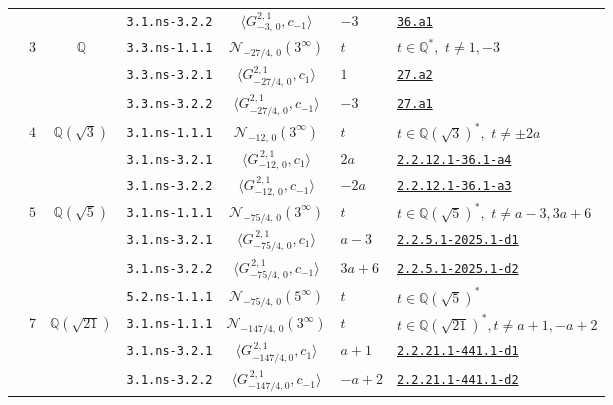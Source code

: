 \documentclass[11pt]{amsart}
\newcommand{\eclabel}[1]{\href{https://www.lmfdb.org/EllipticCurve/Q/#1}{\texttt{#1}}}
\newcommand{\ecnflabel}[2]{\href{https://www.lmfdb.org/EllipticCurve/#1-#2}{\texttt{#1-#2}}}
\theoremstyle{definition}
\newcommand{\Q}{\mathbb Q}
\newcommand{\QQ}{\mathbb Q}
\begin{document}
{\begin{longtable}{|c|c|c|c|c|l|l|}
 & &  & \texttt{3.1.ns-3.2.2} & $\langle G^{2,1}_{-3,\,0},c_{-1}\rangle$ &   $-3$ & \eclabel{36.a1} \\ \cline{2-7}
& {$3$} & {$\QQ$}  
& \texttt{3.3.ns-1.1.1} & $\mathcal{N}_{-27/4,\,0}(3^{\infty})$  &   $t$ &  $t\in \Q^*,\,\,t\ne 1,-3 $ \\ \cline{4-7} 
& &  & \texttt{3.3.ns-3.2.1} & $\langle G^{2,1}_{-27/4,\,0},c_{1}\rangle$ &   $1$ &  \eclabel{27.a2} \\ \cline{4-7} 
& &  & \texttt{3.3.ns-3.2.2} &  $\langle G^{2,1}_{-27/4,\,0},c_{-1}\rangle$ &   $-3$ & \eclabel{27.a1} \\ \cline{2-7}
 & {$4$} &  {$\Q(\sqrt{3})$} 
 & \texttt{3.1.ns-1.1.1} & $\mathcal{N}_{-12,\,0}(3^{\infty})$ &   $t$ &  $t\in \Q(\sqrt{3})^*,\,\,t\ne \pm 2a $ \\ \cline{4-7} 
& &  & \texttt{3.1.ns-3.2.1} & $\langle G^{\,2,1}_{-12,\,0},c_{1}\rangle$ &   $2a$ &  \ecnflabel{2.2.12.1}{36.1-a4} \\ \cline{4-7} 
& &  & \texttt{3.1.ns-3.2.2} & $\langle G^{\,2,1}_{-12,\,0},c_{-1}\rangle$ &   $-2a$ &  \ecnflabel{2.2.12.1}{36.1-a3} \\ 
\cline{2-7}
 &  {$5$} &  {$\Q(\sqrt{5})$} 
& \texttt{3.1.ns-1.1.1} & $\mathcal{N}_{-75/4,\,0}(3^{\infty})$ &   $t$ &  $t\in \Q(\sqrt{5})^*,\,\,t\ne a - 3, 3a + 6  $ \\ \cline{4-7} 
&& &   \texttt{3.1.ns-3.2.1} & $\langle G^{\,2,1}_{-75/4,\,0},c_{1}\rangle$ &   $a - 3$ &  \ecnflabel{2.2.5.1}{2025.1-d1} \\ 
\cline{4-7} 
&&   & \texttt{3.1.ns-3.2.2} & $\langle G^{\, 2,1}_{-75/4,\,0},c_{-1}\rangle$ &   $3a + 6$ & \ecnflabel{2.2.5.1}{2025.1-d2} \\ \cline{4-7} 
& &  & \texttt{5.2.ns-1.1.1} & $\mathcal{N}_{-75/4,\,0}(5^{\infty})$ &   $t$ &  $t\in \Q(\sqrt{5})^*$ \\ \cline{2-7}
 & {$7$} &  {$\Q(\sqrt{21})$} 
 & \texttt{3.1.ns-1.1.1} & $\mathcal{N}_{-147/4,\,0}(3^{\infty})$ &   $t$ &  $t\in \Q(\sqrt{21})^*, t \ne a + 1, -a + 2$ \\ \cline{4-7} 
& &  & \texttt{3.1.ns-3.2.1} & $\langle G^{\, 2, 1}_{-147/4, 0}, c_1 \rangle$ &   $a + 1$ &  \ecnflabel{2.2.21.1}{441.1-d1} \\ \cline{4-7} 
& &  & \texttt{3.1.ns-3.2.2} & $\langle G^{\, 2, 1}_{-147/4, 0}, c_{-1} \rangle$ &   $-a + 2$ &  \ecnflabel{2.2.21.1}{441.1-d2}  \\ \cline{4-7} 

\end{longtable}}
\end{document}
